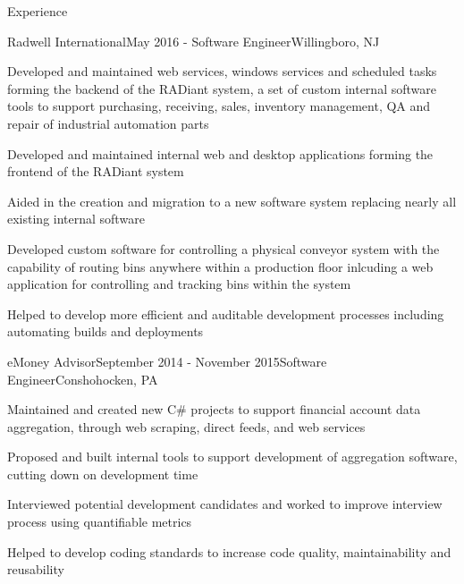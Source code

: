 \documentclass{resume} %
\begin{document}
\begin{rSection}{Experience}

\begin{rSubsection}{Radwell International}{May 2016 - }{Software Engineer}{Willingboro, NJ}
\item Developed and maintained web services, windows services and scheduled tasks forming the backend of the RADiant system, a set of custom internal software tools to support purchasing, receiving, sales, inventory management, QA and repair of industrial automation parts
\item Developed and maintained internal web and desktop applications forming the frontend of the RADiant system
\item Aided in the creation and migration to a new software system replacing nearly all existing internal software 
\item Developed custom software for controlling a physical conveyor system with the capability of routing bins anywhere within a production floor inlcuding a web application for controlling and tracking bins within the system
\item Helped to develop more efficient and auditable development processes including automating builds and deployments
\end{rSubsection}


\begin{rSubsection}{eMoney Advisor}{September 2014 - November 2015}{Software Engineer}{Conshohocken, PA}
\item Maintained and created new C\# projects to support financial account data aggregation, through web scraping, direct feeds, and web services
\item Proposed and built internal tools to support development of aggregation software, cutting down on development time
\item Interviewed potential development candidates and worked to improve interview process using quantifiable metrics
\item Helped to develop coding standards to increase code quality, maintainability and reusability
\end{rSubsection}



\end{rSection}
\end{document}
